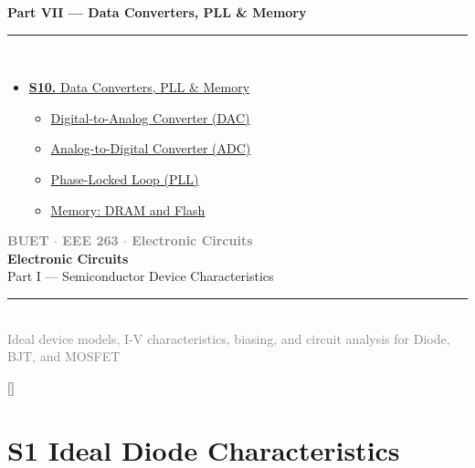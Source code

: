 \documentclass[12pt,a3paper]{article}
\newcommand{\secdivider}[3]{%
  \newpage\thispagestyle{empty}%
  \vspace*{\fill}%
  \begin{tcolorbox}[enhanced,colback=#3!6,colframe=#3,boxrule=1.5pt,arc=8pt,
    left=20pt,right=20pt,top=22pt,bottom=22pt,
    shadow={3pt}{-3pt}{0pt}{black!15}]
    \centering
    {\large\textcolor{gray}{\textbf{BUET $\cdot$ EEE 263 $\cdot$ Electronic Circuits}}}\\[8pt]
    {\fontsize{26}{32}\selectfont\bfseries\textcolor{#3}{Electronic Circuits}}\\[6pt]
    {\fontsize{15}{19}\selectfont\textcolor{dgray}{#1}}\\[12pt]
    \textcolor{#3!60}{\rule{0.5\textwidth}{0.5pt}}\\[6pt]
    {\small\textcolor{gray}{#2}}
  \end{tcolorbox}%
  \vspace*{\fill}\newpage%
}
\begin{document}
\begin{tcolorbox}[breakable,colback=cH!5,colframe=cH,boxrule=1pt,arc=5pt,
  left=8pt,right=8pt,top=8pt,bottom=8pt,before skip=4pt]
  {\large\bfseries\textcolor{cH}{Part VII --- Data Converters, PLL \& Memory}}\\[5pt]
  \textcolor{cH!40}{\rule{\textwidth}{0.4pt}}\\[3pt]
  \small\begin{itemize}[leftmargin=1.2em,itemsep=1pt,label={\textcolor{cH}{$\triangleright$}}]
    \item \hyperref[sec:S10]{\textbf{S10.} Data Converters, PLL \& Memory}
      \begin{itemize}[leftmargin=1.5em,itemsep=0pt,label={\textcolor{cH}{$\cdot$}}]
        \item \hyperref[sub:s10-dac]{Digital-to-Analog Converter (DAC)}
        \item \hyperref[sub:s10-adc]{Analog-to-Digital Converter (ADC)}
        \item \hyperref[sub:s10-pll]{Phase-Locked Loop (PLL)}
        \item \hyperref[sub:s10-memory]{Memory: DRAM and Flash}
      \end{itemize}
  \end{itemize}
\end{tcolorbox}

\newpage


\secdivider{Part I --- Semiconductor Device Characteristics}{Ideal device models, I-V characteristics, biasing, and circuit analysis for Diode, BJT, and MOSFET}{cA}

\label{sec:S1}
\titleformat{\section}{\large\bfseries\color{cA}}{}{0em}{}[\titlerule]
\section*{S1 \quad Ideal Diode Characteristics}
\end{document}
